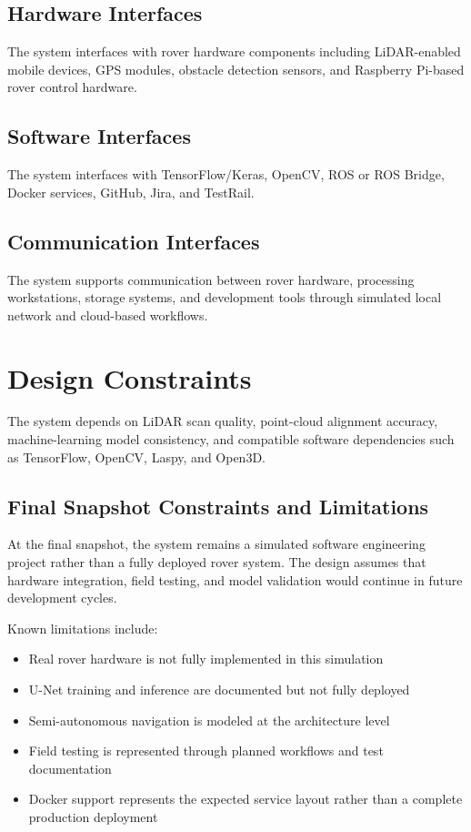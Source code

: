 \documentclass{article}
\begin{document}
\subsection{Hardware Interfaces}

The system interfaces with rover hardware components including LiDAR-enabled mobile devices, GPS modules, obstacle detection sensors, and Raspberry Pi-based rover control hardware.

\subsection{Software Interfaces}

The system interfaces with TensorFlow/Keras, OpenCV, ROS or ROS Bridge, Docker services, GitHub, Jira, and TestRail.

\subsection{Communication Interfaces}

The system supports communication between rover hardware, processing workstations, storage systems, and development tools through simulated local network and cloud-based workflows.

\section{Design Constraints}

The system depends on LiDAR scan quality, point-cloud alignment accuracy, machine-learning model consistency, and compatible software dependencies such as TensorFlow, OpenCV, Laspy, and Open3D.

\subsection{Final Snapshot Constraints and Limitations}

At the final snapshot, the system remains a simulated software engineering project rather than a fully deployed rover system. The design assumes that hardware integration, field testing, and model validation would continue in future development cycles.

Known limitations include:

\begin{itemize}
    \item Real rover hardware is not fully implemented in this simulation
    \item U-Net training and inference are documented but not fully deployed
    \item Semi-autonomous navigation is modeled at the architecture level
    \item Field testing is represented through planned workflows and test documentation
    \item Docker support represents the expected service layout rather than a complete production deployment
\end{itemize}
\end{document}
